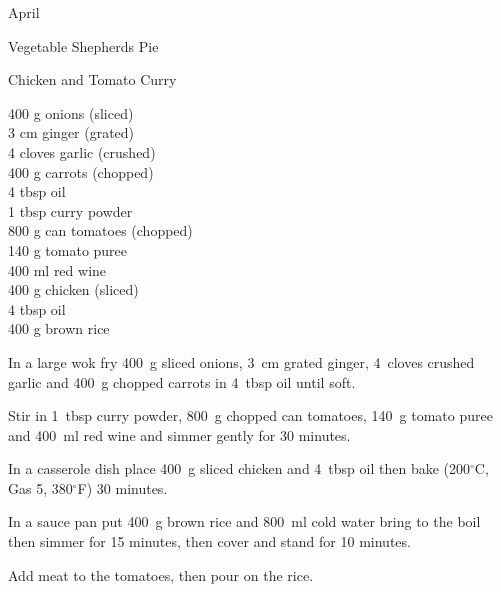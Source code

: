 \begin{menu}{April}
\begin{recipe}{2}{Vegetable Shepherds Pie}
\begin{instructions}
    \end{instructions}
    \end{recipe}%
  
    \begin{recipe}{2}{Chicken and Tomato Curry}%
		\begin{ingredients}
		400 g onions (sliced) \\
	3 cm ginger (grated) \\
	4 cloves garlic (crushed) \\
	400 g carrots (chopped) \\
	4 tbsp oil  \\
	1 tbsp curry powder  \\
	800 g can tomatoes (chopped) \\
	140 g tomato puree  \\
	400 ml red wine  \\
	400 g chicken (sliced) \\
	4 tbsp oil  \\
	400 g brown rice  \\
	
		\end{ingredients}
	
    \begin{instructions}
    \item 
        In a large wok fry
        400~g sliced onions,
        3~cm grated ginger,
        4~cloves crushed garlic
        and
        400~g chopped carrots
        in
        4~tbsp  oil
        until soft.
      \item 
        Stir in
        1~tbsp  curry powder,
        800~g chopped can tomatoes,
        140~g  tomato puree
        and
        400~ml  red wine
        and simmer gently for 30 minutes.
      \item 
        In a casserole dish place
        400~g sliced chicken
        and
        4~tbsp  oil
        then bake (200$^{\circ}$C, Gas 5, 380$^{\circ}$F) 30 minutes.
      \item 
      In a
      sauce pan
      put
      400~g  brown rice
      and
      800~ml  cold water
      bring to the boil then simmer for 15 minutes,
      then cover and stand for 10 minutes.
    \item 
        Add meat to the tomatoes, then pour on the rice.
      
    \end{instructions}
    \end{recipe}%
  
    \clearpage
    \end{menu}
	
